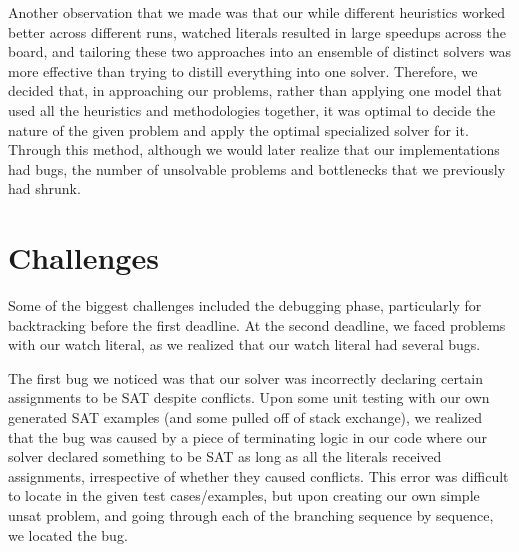 \documentclass[titlepage]{article}
\begin{document}
\vspace{10pt}

\noindent Another observation that we made was that our while different heuristics worked better across different runs, watched literals resulted in large speedups across the board, and tailoring these two approaches into an ensemble of distinct solvers was more effective than trying to distill everything into one solver. Therefore, we decided that, in approaching our problems, rather than applying one model that used all the heuristics and methodologies together, it was optimal to decide the nature of the given problem and apply the optimal specialized solver for it. Through this method, although we would later realize that our implementations had bugs, the number of unsolvable problems and bottlenecks that we previously had shrunk. 

\section*{Challenges}

\noindent Some of the biggest challenges included the debugging phase, particularly for backtracking before the first deadline. At the second deadline, we faced problems with our watch literal, as we realized that our watch literal had several bugs.

\vspace{10pt}

\noindent The first bug we noticed was that our solver was incorrectly declaring certain assignments to be SAT despite conflicts. Upon some unit testing with our own generated SAT examples (and some pulled off of stack exchange), we realized that the bug was caused by a piece of terminating logic in our code where our solver declared something to be SAT as long as all the literals received assignments, irrespective of whether they caused conflicts. This error was difficult to locate in the given test cases/examples, but upon creating our own simple unsat problem, and going through each of the branching sequence by sequence, we located the bug.

\vspace{10pt}
\end{document}
